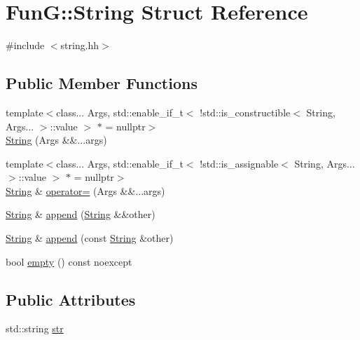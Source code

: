\hypertarget{structFunG_1_1String}{\section{Fun\-G\-:\-:String Struct Reference}
\label{structFunG_1_1String}
}


{\ttfamily \#include $<$string.\-hh$>$}

\subsection*{Public Member Functions}
\begin{DoxyCompactItemize}
\item 
{\footnotesize template$<$class... Args, std\-::enable\-\_\-if\-\_\-t$<$ !std\-::is\-\_\-constructible$<$ String, Args... $>$\-::value $>$ $\ast$  = nullptr$>$ }\\\hyperlink{structFunG_1_1String_a99f9a8cc28b296050f9117c9c64d08a3}{String} (Args \&\&...args)
\item 
{\footnotesize template$<$class... Args, std\-::enable\-\_\-if\-\_\-t$<$ !std\-::is\-\_\-assignable$<$ String, Args... $>$\-::value $>$ $\ast$  = nullptr$>$ }\\\hyperlink{structFunG_1_1String}{String} \& \hyperlink{structFunG_1_1String_abdac0945a9c951c58c52a816fa7b5ec0}{operator=} (Args \&\&...args)
\item 
\hyperlink{structFunG_1_1String}{String} \& \hyperlink{structFunG_1_1String_a3c6066c15eb0344101f6973051966641}{append} (\hyperlink{structFunG_1_1String}{String} \&\&other)
\item 
\hyperlink{structFunG_1_1String}{String} \& \hyperlink{structFunG_1_1String_a9410c2ecad38fda7772ab8f359524ce5}{append} (const \hyperlink{structFunG_1_1String}{String} \&other)
\item 
bool \hyperlink{structFunG_1_1String_a4ec6d7877d78da43f3d38fc87242359b}{empty} () const noexcept
\end{DoxyCompactItemize}
\subsection*{Public Attributes}
\begin{DoxyCompactItemize}
\item 
std\-::string \hyperlink{structFunG_1_1String_a60b43077177cbb213f1d65ff60c13596}{str}
\end{DoxyCompactItemize}


